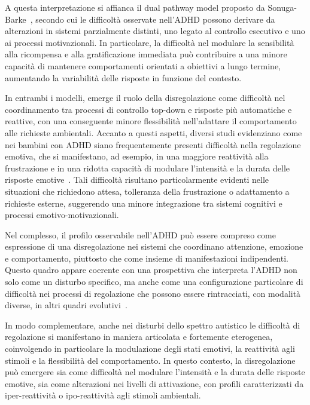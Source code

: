             A questa interpretazione si affianca il dual pathway model proposto da Sonuga-Barke~\cite{sonugabarke2005}, secondo cui le difficoltà osservate nell'ADHD possono derivare da alterazioni in sistemi parzialmente distinti, uno legato al controllo esecutivo e uno ai processi motivazionali. In particolare, la difficoltà nel modulare la sensibilità alla ricompensa e alla gratificazione immediata può contribuire a una minore capacità di mantenere comportamenti orientati a obiettivi a lungo termine, aumentando la variabilità delle risposte in funzione del contesto.

            In entrambi i modelli, emerge il ruolo della disregolazione come difficoltà nel coordinamento tra processi di controllo top-down e risposte più automatiche e reattive, con una conseguente minore flessibilità nell'adattare il comportamento alle richieste ambientali. Accanto a questi aspetti, diversi studi evidenziano come nei bambini con ADHD siano frequentemente presenti difficoltà nella regolazione emotiva, che si manifestano, ad esempio, in una maggiore reattività alla frustrazione e in una ridotta capacità di modulare l'intensità e la durata delle risposte emotive~\cite{eisenberg2010,beauchaine2019}. Tali difficoltà risultano particolarmente evidenti nelle situazioni che richiedono attesa, tolleranza della frustrazione o adattamento a richieste esterne, suggerendo una minore integrazione tra sistemi cognitivi e processi emotivo-motivazionali.

            Nel complesso, il profilo osservabile nell'ADHD può essere compreso come espressione di una disregolazione nei sistemi che coordinano attenzione, emozione e comportamento, piuttosto che come insieme di manifestazioni indipendenti. Questo quadro appare coerente con una prospettiva che interpreta l'ADHD non solo come un disturbo specifico, ma anche come una configurazione particolare di difficoltà nei processi di regolazione che possono essere rintracciati, con modalità diverse, in altri quadri evolutivi~\cite{blair2015,zelazo2020}.

            In modo complementare, anche nei disturbi dello spettro autistico le difficoltà di regolazione si manifestano in maniera articolata e fortemente eterogenea, coinvolgendo in particolare la modulazione degli stati emotivi, la reattività agli stimoli e la flessibilità del comportamento. In questo contesto, la disregolazione può emergere sia come difficoltà nel modulare l'intensità e la durata delle risposte emotive, sia come alterazioni nei livelli di attivazione, con profili caratterizzati da iper-reattività o ipo-reattività agli stimoli ambientali.

